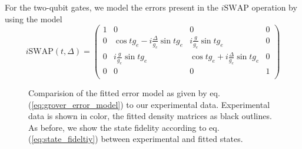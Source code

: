For the two-qubit gates, we model the errors present in the $i\mathrm{SWAP}$ operation by using the model
%
\begin{equation}
i\mathrm{SWAP}(t,\Delta) = \left(
			\begin{array}{cccc}
				1 & 0 & 0 & 0 \\
				0 & \cos{t g_{e}}-i\frac{\Delta}{g_{e}}\sin{t g_{e}} & i \frac{g}{g_e}\sin{t g_{e}} & 0 \\
				0 & i\frac{g}{g_e}\sin{t g_{e}} & \cos{t g_{e}}+i\frac{\Delta}{g_{e}}\sin{t g_{e}} & 0 \\
				0 & 0 & 0 & 1 \\
			\end{array}
	\right) \label{eq:swap_with_detuning}
\end{equation}
%
\begin{figure}
	\centering
	\caption[Comparision of the general error model to our experimental data]{Comparision of the fitted error model as given by eq. (\ref{eq:grover_error_model}) to our experimental data. Experimental data is shown in color, the fitted density matrices as black outlines. As before, we show the state fidelity according to eq. (\ref{eq:state_fideltiy}) between experimental and fitted states.}
	\label{fig:grover_error_model}
\end{figure}

